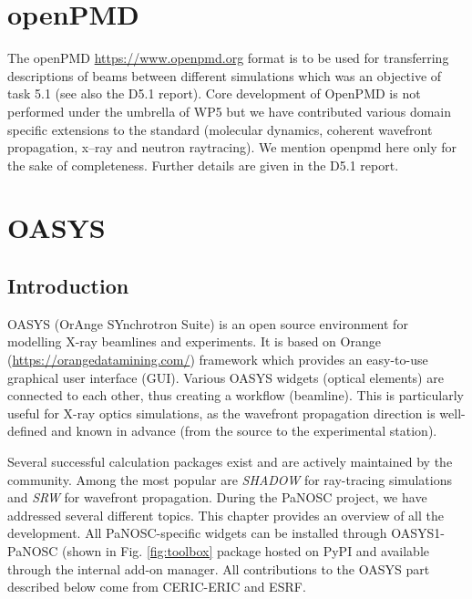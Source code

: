 \documentclass[11pt, a4paper]{article}
\begin{document}
\clearpage
\section{openPMD\label{sec:openpmd}}
The openPMD \href{https://www.openpmd.org}{https://www.openpmd.org} format is to
be used for transferring descriptions of beams between different simulations
which was an objective of task 5.1 (see also the D5.1 report).
Core development of OpenPMD is not performed under the umbrella of WP5 but we
have contributed various domain specific extensions to the standard (molecular
dynamics, coherent wavefront propagation, x--ray and neutron raytracing). We mention
openpmd here only for the sake of completeness. Further details are given in the
D5.1 report.
\section{OASYS}

\subsection{Introduction}

OASYS (OrAnge SYnchrotron Suite) is an open source environment for modelling X-ray beamlines and experiments. It is based on Orange (\url{https://orangedatamining.com/}) framework which provides an easy-to-use graphical user interface (GUI). Various OASYS widgets (optical elements) are connected to each other, thus creating a workflow (beamline). This is particularly useful for X-ray optics simulations, as the wavefront propagation direction is well-defined and known in advance (from the source to the experimental station).

Several successful calculation packages exist and are actively maintained by the community. Among the most popular are \emph{SHADOW} for ray-tracing simulations and \emph{SRW} for wavefront propagation. During the PaNOSC project, we have addressed several different topics. This chapter provides an overview of all the development. All PaNOSC-specific widgets can be installed through OASYS1-PaNOSC (shown in Fig. \ref{fig:toolbox} package hosted on PyPI and available through the internal add-on manager. All contributions to the OASYS part described below come from CERIC-ERIC and ESRF.
\end{document}
